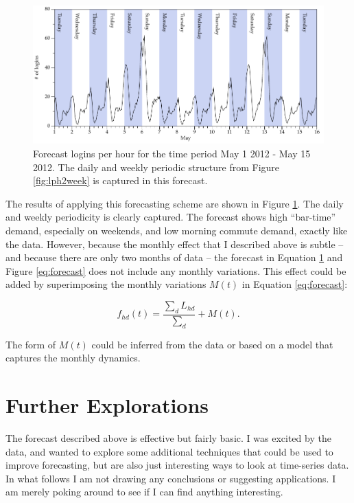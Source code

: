 \documentclass{tufte-handout}
\begin{document}
\begin{figure}[h]
    \includegraphics[width=\linewidth]{forecasts.pdf}%
	\caption{Forecast logins per hour for the time period May 1 2012 - May 15 2012. The daily and weekly periodic structure from Figure \ref{fig:lph2week} is captured in this forecast.}%
	\label{fig:forecasts}%
\end{figure}

The results of applying this forecasting scheme are shown in Figure \ref{fig:forecasts}. The daily and weekly periodicity is clearly captured. The forecast shows high ``bar-time'' demand, especially on weekends, and low morning commute demand, exactly like the data. However, because the monthly effect that I described above is subtle -- and because there are only two months of data -- the forecast in Equation \ref{fig:forecasts} and Figure \ref{eq:forecast} does not include any monthly variations. This effect could be added by superimposing the monthly variations $M(t)$ in Equation \ref{eq:forecast}:

\begin{equation}
        f_{hd}(t) = \frac{\sum_d L_{hd}}{\sum_d} + M(t)
        \label{eq:forecast2}.
\end{equation}

\noindent The form of $M(t)$ could be inferred from the data or based on a model that captures the monthly dynamics.

\section{Further Explorations}

The forecast described above is effective but fairly basic. I was excited by the data, and wanted to explore some additional techniques that could be used to improve forecasting, but are also just interesting ways to look at time-series data. In what follows I am not drawing any conclusions or suggesting applications. I am merely poking around to see if I can find anything interesting.
\end{document}
